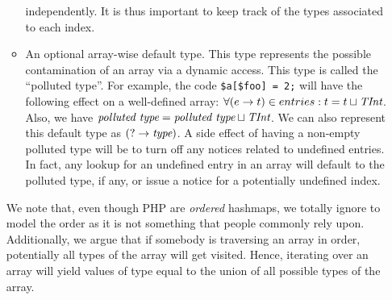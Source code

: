 \documentclass[a4paper]{article}
\begin{document}
\begin{itemize}
\begin{itemize}
          independently. It is thus important to keep track of the types
          associated to each index.
        \item An optional array-wise default type. This type represents the
          possible contamination of an array via a dynamic access. This type is
          called the ``polluted type''. For example, the code
          \verb/$a[$foo] = 2;/ will have the following effect on a well-defined
          array: $\forall (e \rightarrow t) \in entries: t = t \sqcup
          \emph{TInt}$. Also, we have $\emph{polluted type} = \emph{polluted
          type} \sqcup \emph{TInt}$. We can also represent this default type as
          $(? \rightarrow \emph{type})$. A side effect of having a non-empty
          polluted type will be to turn off any notices related to undefined
          entries. In fact, any lookup for an undefined entry in an array will
          default to the polluted type, if any, or issue a notice for a
          potentially undefined index.
    \end{itemize}
    We note that, even though PHP are \emph{ordered} hashmaps, we totally
    ignore to model the order as it is not something that people commonly rely
    upon. Additionally, we argue that if somebody is traversing an array in
    order, potentially all types of the array will get visited. Hence,
    iterating over an array will yield values of type equal to the union of all
    possible types of the array.


\end{itemize}
\end{document}
